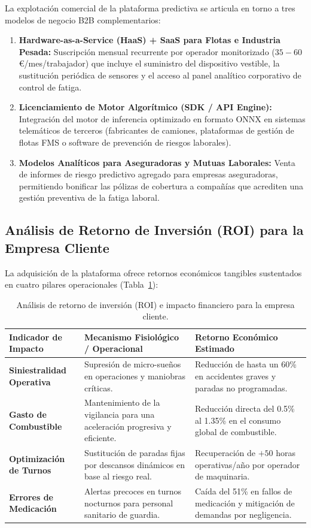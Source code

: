 La explotación comercial de la plataforma predictiva se articula en torno a tres modelos de negocio B2B complementarios:
\begin{enumerate}
    \item \textbf{Hardware-as-a-Service (HaaS) + SaaS para Flotas e Industria Pesada:} Suscripción mensual recurrente por operador monitorizado ($35 - 60$\,€/mes/trabajador) que incluye el suministro del dispositivo vestible, la sustitución periódica de sensores y el acceso al panel analítico corporativo de control de fatiga.
    \item \textbf{Licenciamiento de Motor Algorítmico (SDK / API Engine):} Integración del motor de inferencia optimizado en formato ONNX en sistemas telemáticos de terceros (fabricantes de camiones, plataformas de gestión de flotas FMS o software de prevención de riesgos laborales).
    \item \textbf{Modelos Analíticos para Aseguradoras y Mutuas Laborales:} Venta de informes de riesgo predictivo agregado para empresas aseguradoras, permitiendo bonificar las pólizas de cobertura a compañías que acrediten una gestión preventiva de la fatiga laboral.
\end{enumerate}

\subsection{Análisis de Retorno de Inversión (ROI) para la Empresa Cliente}

La adquisición de la plataforma ofrece retornos económicos tangibles sustentados en cuatro pilares operacionales (Tabla~\ref{tab:roi_estimado}):

\begin{table}[htbp]
\centering
\caption{Análisis de retorno de inversión (ROI) e impacto financiero para la empresa cliente.}
\label{tab:roi_estimado}
\small
\begin{tabularx}{\linewidth}{@{}p{4.4cm}>{\raggedright\arraybackslash}X>{\raggedright\arraybackslash}p{4.6cm}@{}}
\toprule
\textbf{Indicador de Impacto} & \textbf{Mecanismo Fisiológico / Operacional} & \textbf{Retorno Económico Estimado} \\
\midrule
\textbf{Siniestralidad Operativa} & Supresión de micro-sueños en operaciones y maniobras críticas. & Reducción de hasta un 60\% en accidentes graves y paradas no programadas. \\
\midrule
\textbf{Gasto de Combustible} & Mantenimiento de la vigilancia para una aceleración progresiva y eficiente. & Reducción directa del 0.5\% al 1.35\% en el consumo global de combustible. \\
\midrule
\textbf{Optimización de Turnos} & Sustitución de paradas fijas por descansos dinámicos en base al riesgo real. & Recuperación de $+50$ horas operativas/año por operador de maquinaria. \\
\midrule
\textbf{Errores de Medicación} & Alertas precoces en turnos nocturnos para personal sanitario de guardia. & Caída del 51\% en fallos de medicación y mitigación de demandas por negligencia. \\
\bottomrule
\end{tabularx}
\end{table}

